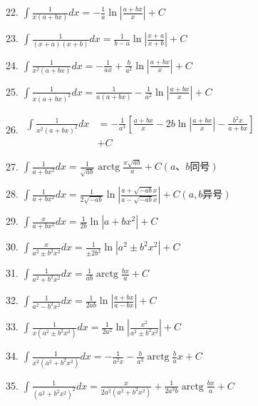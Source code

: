 \documentclass[10pt]{article}
\begin{document}
22. \(\int \frac{1}{x\left( {a + {bx}}\right) }{dx} = - \frac{1}{a}\ln \left| \frac{a + {bx}}{x}\right| + C\)

23. \(\int \frac{1}{\left( {x + a}\right) \left( {x + b}\right) }{dx} = \frac{1}{b - a}\ln \left| \frac{x + a}{x + b}\right| + C\)

24. \(\int \frac{1}{{x}^{2}\left( {a + {bx}}\right) }{dx} = - \frac{1}{ax} + \frac{b}{{a}^{2}}\ln \left| \frac{a + {bx}}{x}\right| + C\)

25. \(\int \frac{1}{x{\left( a + bx\right) }^{2}}{dx} = \frac{1}{a\left( {a + {bx}}\right) } - \frac{1}{{a}^{2}}\ln \left| \frac{a + {bx}}{x}\right| + C\)

26. \(\begin{aligned} \int \frac{1}{{x}^{2}{\left( a + bx\right) }^{2}}{dx} & = - \frac{1}{{a}^{3}}\left\lbrack {\frac{a + {bx}}{x} - {2b}\ln \left| \frac{a + {bx}}{x}\right| - \frac{{b}^{2}x}{a + {bx}}}\right\rbrack \\ & + C \end{aligned}\)

27. \(\int \frac{1}{a + b{x}^{2}}{dx} = \frac{1}{\sqrt{ab}}\operatorname{arctg}\frac{x\sqrt{ab}}{a} + C\left( {a\text{、}b\text{同号}}\right)\)

28. \(\int \frac{1}{a + b{x}^{2}}{dx} = \frac{1}{2\sqrt{-{ab}}}\ln \left| \frac{a + \sqrt{-{ab}}x}{a - \sqrt{-{ab}}x}\right| + C\left( {a,b\text{异号}}\right)\)

29. \(\int \frac{x}{a + b{x}^{2}}{dx} = \frac{1}{2b}\ln \left| {a + b{x}^{2}}\right| + C\)

30. \(\int \frac{x}{{a}^{2} \pm {b}^{2}{x}^{2}}{dx} = \frac{1}{\pm 2{b}^{2}}\ln \left| {{a}^{2} \pm {b}^{2}{x}^{2}}\right| + C\)

31. \(\int \frac{1}{{a}^{2} + {b}^{2}{x}^{2}}{dx} = \frac{1}{ab}\operatorname{arctg}\frac{bx}{a} + C\)

32. \(\int \frac{1}{{a}^{2} - {b}^{2}{x}^{2}}{dx} = \frac{1}{2ab}\ln \left| \frac{a + {bx}}{a - {bx}}\right| + C\)

33. \(\int \frac{1}{x\left( {{a}^{2} \pm {b}^{2}{x}^{2}}\right) }{dx} = \frac{1}{2{a}^{2}}\ln \left| \frac{{x}^{2}}{{a}^{2} \pm {b}^{2}{x}^{2}}\right| + C\)

34. \(\int \frac{1}{{x}^{2}\left( {{a}^{2} + {b}^{2}{x}^{2}}\right) }{dx} = - \frac{1}{{a}^{2}x} - \frac{b}{{a}^{3}}\operatorname{arctg}\frac{b}{a}x + C\)

35. \(\int \frac{1}{{\left( {a}^{2} + {b}^{2}{x}^{2}\right) }^{2}}{dx} = \frac{x}{2{a}^{2}\left( {{a}^{2} + {b}^{2}{x}^{2}}\right) } + \frac{1}{2{a}^{3}b}\operatorname{arctg}\frac{bx}{a} + C\)
\end{document}
